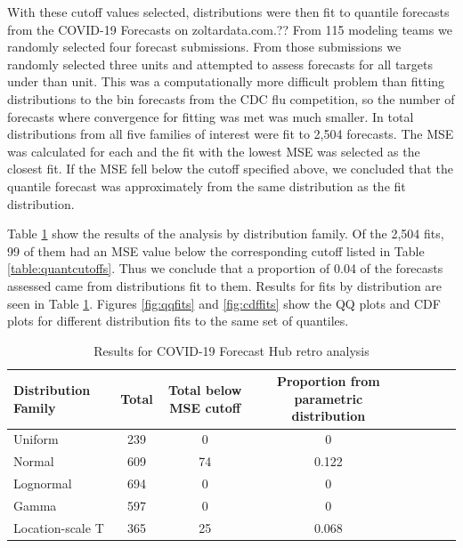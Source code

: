 \documentclass[11pt,notitlepage]{isuthesis}
\begin{document}
With these cutoff values selected, distributions were then fit to quantile 
forecasts
from the COVID-19 Forecasts on zoltardata.com.?? 
From 115 modeling teams we randomly selected four forecast submissions. From 
those submissions we randomly selected three units and attempted to assess
forecasts for all targets under than unit.
This was a computationally more
difficult problem than fitting distributions to the bin forecasts from the CDC
flu competition, so the number of forecasts where convergence for fitting was
met was much smaller. In total distributions from all five families of interest
were fit to 2,504 forecasts. 
The MSE was calculated for each and the fit with the
lowest MSE was selected as the closest fit. If the MSE fell below the cutoff
specified above, we concluded that the quantile forecast was approximately
from the same distribution as the fit distribution. 

Table \ref{table:cresults} show the results of the analysis by distribution
family.
Of the 2,504 fits, 99 of 
them had an MSE value below the corresponding cutoff listed in Table
\ref{table:quantcutoffs}. Thus we conclude that a proportion of 0.04 of the 
forecasts assessed came from distributions fit to them.
Results for fits by
distribution are seen in Table \ref{table:cresults}.
Figures \ref{fig:qqfits} and \ref{fig:cdffits} show the QQ plots and CDF plots
for different distribution fits to the same set of quantiles.



\begin{table}[h!]
  \centering
  \begin{tabular}{l*{6}{c}r}
  Distribution Family   & Total    & Total below MSE cutoff 
  & Proportion from parametric distribution\\
  \hline
  Uniform               & 239      & 0    & 0    \\
  Normal                & 609      & 74   & 0.122    \\
  Lognormal             & 694      & 0    & 0    \\
  Gamma                 & 597      & 0    & 0    \\
  Location-scale T      & 365      & 25   & 0.068    \\
  \end{tabular}
  \begin{center}
\begin{minipage}{10cm}
\captionsetup{font=scriptsize}
  \caption[COVID-19 Forecast Hub results]{Results for COVID-19 Forecast Hub
  retro analysis}
  \label{table:cresults}
  \end{minipage}
  \end{center}
\end{table}
\end{document}
